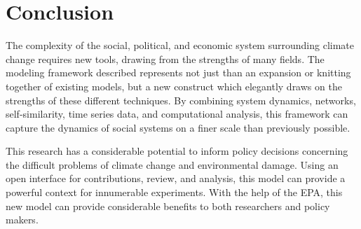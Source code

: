 \documentclass[12pt, oneside]{amsart}
\begin{document}
\section{Conclusion}

The complexity of the social, political, and economic system surrounding climate change requires new tools, drawing from the strengths of many fields.  The modeling framework described represents not just than an expansion or knitting together of existing models, but a new construct which elegantly draws on the strengths of these different techniques.  By combining system dynamics, networks, self-similarity, time series data, and computational analysis, this framework can capture the dynamics of social systems on a finer scale than previously possible.

This research has a considerable potential to inform policy decisions concerning the difficult problems of climate change and environmental damage.  Using an open interface for contributions, review, and analysis, this model can provide a powerful context for innumerable experiments.  With the help of the EPA, this new model can provide considerable benefits to both researchers and policy makers.

\newpage
{}

\end{document}
